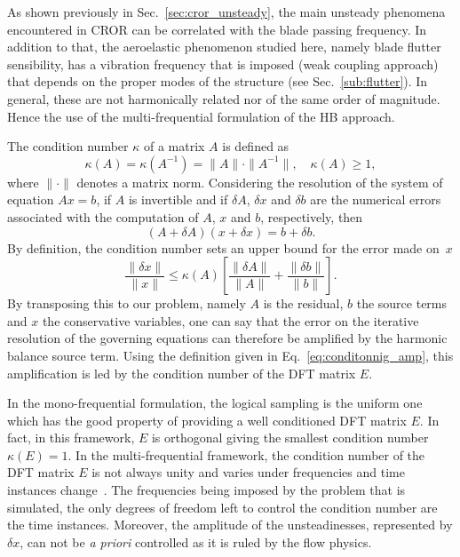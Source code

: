 
As shown previously in Sec.~\ref{sec:cror_unsteady}, the main unsteady
phenomena encountered in CROR can be correlated with the blade passing
frequency.
In addition to that, the aeroelastic phenomenon
studied here, namely blade flutter sensibility, has a vibration frequency that
is imposed (weak coupling approach) that depends on the proper modes
of the structure (see Sec.~\ref{sub:flutter}).
In general, these are not harmonically related nor
of the same order of magnitude. Hence the use of the
multi-frequential formulation of the HB approach. 

The condition number $\kappa$ of a matrix $A$ is defined as
\begin{equation}
  \kappa (A) = \kappa (A^{-1}) = \| A \| \cdot \| A^{-1} \|, \quad
    \kappa(A) \geq 1,
\end{equation}
where $\| \cdot \|$ denotes a matrix norm. Considering the resolution
of the system of equation
$A x = b$, if $A$ is invertible and if $\delta A$, $\delta x$ and
$\delta b$ are the numerical errors associated with the computation of
$A$, $x$ and $b$, respectively, then
\begin{equation}
   (A + \delta A)(x + \delta x) = b + \delta b.
   \label{eq:error_reso}
\end{equation}
By definition, the condition number sets an upper bound for 
the error made on~$x$
\begin{equation}
   \frac{\| \delta x \|}{\| x \|} \leq 
   \kappa(A)\left[\frac{\| \delta A \|}{\| A \|} + 
   \frac{\| \delta b \|}{\| b \|} \right].
   \label{eq:conditonnig_amp}
\end{equation}
By transposing this to our problem, namely $A$ is the residual, 
$b$ the source terms and $x$ the conservative variables, one can say that
the error on the iterative resolution of the governing equations can
therefore be amplified by the harmonic balance source term.
Using the definition given in Eq.~\eqref{eq:conditonnig_amp}, this amplification is
led by the condition number of the DFT matrix $E$. 


In the mono-frequential formulation, the logical sampling is the uniform one
which has the good property of providing
a well conditioned DFT matrix $E$. In fact, in this framework, $E$ is orthogonal giving 
the smallest condition number $\kappa (E) = 1$.
In the multi-frequential framework,
the condition number of the DFT matrix $E$ is not always unity and
varies under frequencies and time instances change~\cite{Kundert1988}. 
The frequencies
being imposed by the problem that is simulated,
the only degrees of freedom left to control the condition
number are the time instances. 
Moreover, the amplitude of the unsteadinesses, represented by $\delta x$,
can not be \emph{a priori} controlled as it is ruled by the flow physics. 

